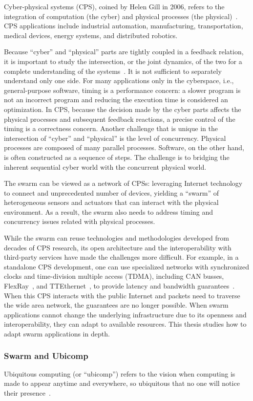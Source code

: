 Cyber-physical systems (CPS), coined by Helen Gill in 2006, refers to the
integration of computation (the cyber) and physical processes (the
physical)~\cite{lee2015past}. CPS applications include industrial automation,
manufacturing, transportation, medical devices, energy systems, and distributed
robotics.

Because ``cyber'' and ``physical'' parts are tightly coupled in a feedback
relation, it is important to study the intersection, or the joint dynamics, of
the two for a complete understanding of the systems~\cite{rajkumar2010cyber}. It
is not sufficient to separately understand only one side. For many applications
only in the cyberspace, i.e., general-purpose software, timing is a performance
concern: a slower program is not an incorrect program and reducing the execution
time is considered an optimization. In CPS, because the decision made by the
cyber parts affects the physical processes and subsequent feedback reactions, a
precise control of the timing is a correctness concern. Another challenge that
is unique in the intersection of ``cyber'' and ``physical'' is the level of
concurrency. Physical processes are composed of many parallel
processes. Software, on the other hand, is often constructed as a sequence of
steps. The challenge is to bridging the inherent sequential cyber world with the
concurrent physical world.

The swarm can be viewed as a network of CPSs: leveraging Internet technology to
connect and unprecedented number of devices, yielding a ``swarm'' of
heterogeneous sensors and actuators that can interact with the physical
environment. As a result, the swarm also needs to address timing and concurrency
issues related with physical processes.

While the swarm can reuse technologies and methodologies developed from decades
of CPS research, its open architecture and the interoperability with third-party
services have made the challenges more difficult. For example, in a standalone
CPS development, one can use specialized networks with synchronized clocks and
time-division multiple access (TDMA), including CAN busses,
FlexRay~\cite{flexray2005flexray}, and TTEthernet~\cite{steiner2008ttethernet},
to provide latency and bandwidth guarantees~\cite{lee2018real}. When this CPS
interacts with the public Internet and packets need to traverse the wide area
network, the guarantees are no longer possible. When swarm applications cannot
change the underlying infrastructure due to its openness and interoperability,
they can adapt to available resources. This thesis studies how to adapt swarm
applications in depth.

\subsubsection{Swarm and Ubicomp}
\label{sec:swarm-wsn}

Ubiquitous computing (or ``ubicomp'') refers to the vision when computing is
made to appear anytime and everywhere, so ubiquitous that no one will notice
their presence~\cite{weiser1993ubiquitous}.


